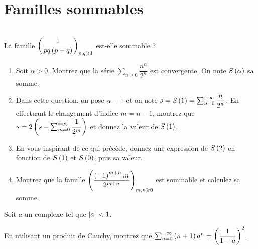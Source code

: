 \chapter{Familles sommables}

\legendeexercices

\begin{exoss}[Exercice 23]~\\
La famille \(\left(\dfrac{1}{pq\left(p+q\right)}\right)_{p,q\geqslant1}\) est-elle sommable ?
\end{exoss}

\begin{corr}
\end{corr}

\begin{exoss}[Exercice 24]
\begin{enumerate}
    \item Soit \(\alpha>0\). Montrez que la série \(\sum_{n\geq0}\dfrac{n^\alpha}{2^n}\) est convergente. On note \(S\left(\alpha\right)\) sa somme. \\
    \item Dans cette question, on pose \(\alpha=1\) et on note \(s=S\left(1\right)=\sum_{n=0}^{+\infty}\dfrac{n}{2^n}\). En effectuant le changement d'indice \(m=n-1\), montrez que \(s=2\left(s-\sum_{m=0}^{+\infty}\dfrac{1}{2^m}\right)\) et donnez la valeur de \(S\left(1\right)\). \\
    \item En vous inspirant de ce qui précède, donnez une expression de \(S\left(2\right)\) en fonction de \(S\left(1\right)\) et \(S\left(0\right)\), puis sa valeur. \\
    \item Montrez que la famille \(\left(\dfrac{\left(-1\right)^{m+n}m}{2^{m+n}}\right)_{m,n\geqslant0}\) est sommable et calculez sa somme.
\end{enumerate}
\end{exoss}

\begin{corr}
\end{corr}

\begin{exoss}[Exercice 25]
Soit \(a\) un complexe tel que \(\left\lvert a\right\rvert<1\).

En utilisant un produit de Cauchy, montrez que \(\sum_{n=0}^{+\infty}\left(n+1\right)a^n=\left(\dfrac{1}{1-a}\right)^2\).
\end{exoss}

\begin{corr}
\end{corr}

